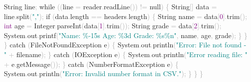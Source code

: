 \documentclass[
  justified,
  openright,
]{tufte-book}
\newcommand{\BuiltInTok}[1]{#1}
\newcommand{\ControlFlowTok}[1]{\textcolor{BrandBlue}{#1}}
\newcommand{\DataTypeTok}[1]{\textcolor{Purple}{#1}}
\newcommand{\DecValTok}[1]{\textcolor{Purple}{#1}}
\newcommand{\FunctionTok}[1]{\textcolor{BrandBlue}{#1}}
\newcommand{\KeywordTok}[1]{\textcolor{BrandBlue}{#1}}
\newcommand{\NormalTok}[1]{#1}
\newcommand{\OperatorTok}[1]{\textcolor{DarkGray}{#1}}
\newcommand{\SpecialCharTok}[1]{\textcolor{Teal}{#1}}
\newcommand{\StringTok}[1]{\textcolor{Teal}{#1}}
\newenvironment{Shaded}{%
  \begin{snugshade}
}{%
  \end{snugshade}
}
\begin{document}
\begin{Shaded}
\begin{Highlighting}[]
            \BuiltInTok{String}\NormalTok{ line}\OperatorTok{;}
            \ControlFlowTok{while} \OperatorTok{((}\NormalTok{line }\OperatorTok{=}\NormalTok{ reader}\OperatorTok{.}\FunctionTok{readLine}\OperatorTok{())} \OperatorTok{!=} \KeywordTok{null}\OperatorTok{)} \OperatorTok{\{}
                \BuiltInTok{String}\OperatorTok{[]}\NormalTok{ data }\OperatorTok{=}\NormalTok{ line}\OperatorTok{.}\FunctionTok{split}\OperatorTok{(}\StringTok{","}\OperatorTok{);}
                \ControlFlowTok{if} \OperatorTok{(}\NormalTok{data}\OperatorTok{.}\FunctionTok{length} \OperatorTok{==}\NormalTok{ headers}\OperatorTok{.}\FunctionTok{length}\OperatorTok{)} \OperatorTok{\{}
                    \BuiltInTok{String}\NormalTok{ name }\OperatorTok{=}\NormalTok{ data}\OperatorTok{[}\DecValTok{0}\OperatorTok{].}\FunctionTok{trim}\OperatorTok{();}
                    \DataTypeTok{int}\NormalTok{ age }\OperatorTok{=} \BuiltInTok{Integer}\OperatorTok{.}\FunctionTok{parseInt}\OperatorTok{(}\NormalTok{data}\OperatorTok{[}\DecValTok{1}\OperatorTok{].}\FunctionTok{trim}\OperatorTok{());}
                    \BuiltInTok{String}\NormalTok{ grade }\OperatorTok{=}\NormalTok{ data}\OperatorTok{[}\DecValTok{2}\OperatorTok{].}\FunctionTok{trim}\OperatorTok{();}
                    \BuiltInTok{System}\OperatorTok{.}\FunctionTok{out}\OperatorTok{.}\FunctionTok{printf}\OperatorTok{(}\StringTok{"Name: }\SpecialCharTok{\%{-}15s}\StringTok{ Age: }\SpecialCharTok{\%3d}\StringTok{  Grade: }\SpecialCharTok{\%s\%n}\StringTok{"}\OperatorTok{,}
\NormalTok{                                      name}\OperatorTok{,}\NormalTok{ age}\OperatorTok{,}\NormalTok{ grade}\OperatorTok{);}
                \OperatorTok{\}}
            \OperatorTok{\}}
        \OperatorTok{\}} \ControlFlowTok{catch} \OperatorTok{(}\BuiltInTok{FileNotFoundException}\NormalTok{ e}\OperatorTok{)} \OperatorTok{\{}
            \BuiltInTok{System}\OperatorTok{.}\FunctionTok{out}\OperatorTok{.}\FunctionTok{println}\OperatorTok{(}\StringTok{"Error: File not found {-} "} \OperatorTok{+}\NormalTok{ filename}\OperatorTok{);}
        \OperatorTok{\}} \ControlFlowTok{catch} \OperatorTok{(}\BuiltInTok{IOException}\NormalTok{ e}\OperatorTok{)} \OperatorTok{\{}
            \BuiltInTok{System}\OperatorTok{.}\FunctionTok{out}\OperatorTok{.}\FunctionTok{println}\OperatorTok{(}\StringTok{"Error reading file: "} \OperatorTok{+}\NormalTok{ e}\OperatorTok{.}\FunctionTok{getMessage}\OperatorTok{());}
        \OperatorTok{\}} \ControlFlowTok{catch} \OperatorTok{(}\BuiltInTok{NumberFormatException}\NormalTok{ e}\OperatorTok{)} \OperatorTok{\{}
            \BuiltInTok{System}\OperatorTok{.}\FunctionTok{out}\OperatorTok{.}\FunctionTok{println}\OperatorTok{(}\StringTok{"Error: Invalid number format in CSV."}\OperatorTok{);}
        \OperatorTok{\}}
    \OperatorTok{\}}
\OperatorTok{\}}
\end{Highlighting}
\end{Shaded}
\end{document}

